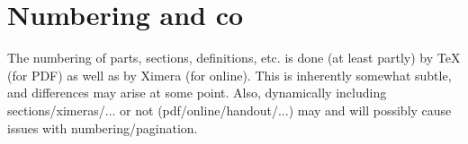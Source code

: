 \documentclass{ximera}
\begin{document}
\section {Numbering and co}

The numbering of parts, sections, definitions, etc. is done (at least partly) by TeX (for PDF) as well as by Ximera (for online). This is inherently somewhat subtle, and differences may arise at some point. Also, dynamically including sections/ximeras/... or not (pdf/online/handout/...) may and will possibly cause issues with numbering/pagination.
\end{document}
